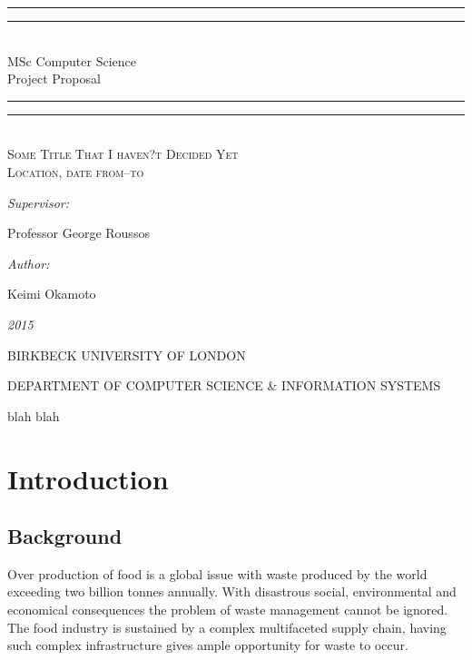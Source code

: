 \documentclass[a4paper, 11pt]{article}
\newlength{\drop}
\begin{document}
  \begin{titlepage}
    \textheight
    \centering
    \vspace*{\baselineskip}
    \rule{\textwidth}{1.6pt}\vspace*{-\baselineskip}\vspace*{2pt}
    \rule{\textwidth}{0.4pt}\\[\baselineskip]
    {\Large{MSc Computer Science\\[0.3\baselineskip] }}
    {\huge{Project Proposal\\[0.3\baselineskip] }}
	
    \rule{\textwidth}{0.4pt}\vspace*{-\baselineskip}\vspace{3.2pt}
    \rule{\textwidth}{1.6pt}
    \\[\baselineskip]
    \scshape
    {\Large Some Title That I haven?t Decided Yet \\}
    Location, date from--to\par
    \vspace*{2\baselineskip}
    {\normalsize\emph{Supervisor: }{\large Professor George Roussos\par}}
    {\normalsize\emph{Author: }{\large Keimi Okamoto\par}}
    
    {\itshape 2015}
    \vfill
    {\large BIRKBECK UNIVERSITY OF LONDON\par}
{\footnotesize DEPARTMENT OF COMPUTER SCIENCE \& INFORMATION SYSTEMS}\par
  \end{titlepage}
  
\tableofcontents
\clearpage

blah blah
\clearpage

\section{Introduction}

\subsection{Background}
Over production of food is a global issue with waste produced by the world exceeding two billion tonnes annually. With disastrous social, environmental and economical consequences the problem of waste management cannot be ignored. The food industry is sustained by a complex multifaceted supply chain, having such complex infrastructure gives ample opportunity for waste to occur. 
\end{document}
